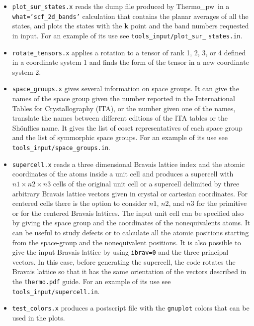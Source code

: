 \documentclass[12pt,a4paper,twoside]{report}
\def\thermo{{\sc Thermo}\_{\sc pw}}
\begin{document}
\begin{itemize}
\item \texttt{plot\_sur\_states.x} reads the dump file produced
by \thermo\ in a \texttt{what='scf\_2d\_bands'} calculation that
contains the planar averages of all the states, and plots
the states with the {\bf k} point and the band numbers requested in input.
For an example of its use see \texttt{tools\_input/plot\_sur\_}
\texttt{states.in}.

\item \texttt{rotate\_tensors.x} applies a rotation to a tensor
of rank 1, 2, 3, or 4 defined in a coordinate system 1 and finds the form
of the tensor in a new coordinate system 2. 

\item \texttt{space\_groups.x} gives several information on space groups.
It can give the names of the space group given the number reported in
the International Tables for Crystallography (ITA), or
the number given one of the names, translate the names between different
editions of the ITA tables or the Sh\"onflies name. It gives the list 
of coset representatives of each space group and the list of symmorphic 
space groups.
For an example of its use see \texttt{tools\_input/space\_groups.in}.

\item \texttt{supercell.x} reads a three dimensional
Bravais lattice index and the atomic coordinates of the atoms inside a unit
cell and produces a supercell with $n1 \times n2 \times n3$ cells of 
the original
unit cell or a supercell delimited by three arbitrary Bravais lattice
vectors given in crystal or cartesian coordinates. For centered cells 
there is the option to consider $n1$, $n2$,
and $n3$ for the primitive or for the centered Bravais lattices.
The input unit cell can be specified also by giving the space group and
the coordinates of the nonequivalents atoms.
It can be useful to study defects or to calculate all the 
atomic positions starting from the space-group and the 
nonequivalent positions.
It is also possible to give the input Bravais lattice by using
\texttt{ibrav=0} and the three principal vectors. In this case,
before generating the supercell, the code rotates the Bravais
lattice so that it has the same orientation of the vectors described
in the \texttt{thermo.pdf} guide.
For an example of its use see \texttt{tools\_input/supercell.in}.

\item \texttt{test\_colors.x} produces a postscript file with the 
\texttt{gnuplot} colors that can be used in the plots.   


\end{itemize}
\end{document}
